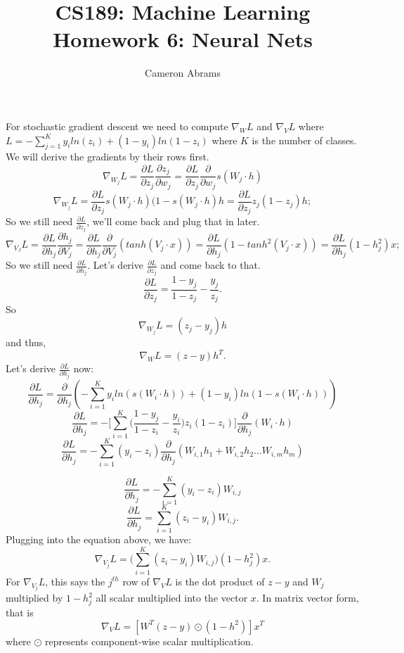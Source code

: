\documentclass[12pt]{article}
\newenvironment{problem}[2][Problem]{\begin{trivlist}
\item[\hskip \labelsep {\bfseries #1}\hskip \labelsep {\bfseries #2.}]}{\end{trivlist}}
\begin{document}
 
 
\title{CS189: Machine Learning\\
\large Homework 6: Neural Nets}
\author{Cameron Abrams}
\maketitle
 
\begin{problem}{1: Derivations}
For stochastic gradient descent we need to compute $\nabla_{W}L$ and $\nabla_{V}L$ where $L= -\sum_{j=1}^{K}y_{i}ln(z_{i}) +(1-y_{i})ln(1-z_{i})$ where $K$ is the number of classes. We will derive the gradients by their rows first.
$$\nabla_{W_{j}}L = \frac{\partial L}{\partial z_{j}}\frac{\partial z_{j}}{\partial w_{j}}=\frac{\partial L}{\partial z_{j}}\frac{\partial}{\partial w_{j}}s(W_{j}\cdot h)$$
$$\nabla_{W_{j}}L= \frac{\partial L}{\partial z_{j}}s(W_{j}\cdot h)(1-s(W_{j}\cdot h)h=\frac{\partial L}{\partial z_{j}}z_{j}(1-z_{j})h;$$
So we still need $\frac{\partial L}{\partial z_{j}}$, we'll come back and plug that in later.
$$\nabla_{V_{J}}L = \frac{\partial L}{\partial h_{j}}\frac{\partial h_{j}}{\partial V_{j}}=\frac{\partial L}{\partial h_{j}}\frac{\partial}{\partial V_{j}}(tanh(V_{j}\cdot x))
=\frac{\partial L}{\partial h_{j}}(1 - tanh^{2}(V_{j}\cdot x))
=\frac{\partial L}{\partial h_{j}}(1 - h_{j}^{2})x;$$
So we still need $\frac{\partial L}{\partial h_{j}}$. Let's derive $\frac{\partial L}{\partial z_{j}}$ and come back to that.
$$\frac{\partial L}{\partial z_{j}} = \frac{1-y_{j}}{1-z_{j}} - \frac{y_{j}}{z_{j}}.$$
So$$\nabla_{W_{j}}L = (z_{j}-y_{j})h$$
and thus, 
$$\nabla_{W}L = (z-y)h^{T}.$$
Let's derive $\frac{\partial L}{\partial h_{j}}$ now:
$$\frac{\partial L}{\partial h_{j}}=\frac{\partial}{\partial h_{j}}(-\sum_{i=1}^{K}y_{i}ln(s(W_{i}\cdot h)) +(1-y_{i})ln(1-s(W_{i}\cdot h)))$$
$$\frac{\partial L}{\partial h_{j}}=-\Big[\sum_{i=1}^{K}\Big(\frac{1-y_{j}}{1-z_{i}} - \frac{y_{i}}{z_{i}}\Big)z_{i}(1-z_{i})\Big]\frac{\partial}{\partial h_{j}}(W_i\cdot h)$$
$$\frac{\partial L}{\partial h_{j}}=-\sum_{i=1}^{K}(y_{i} - z_{i})\frac{\partial}{\partial h_{j}}(W_{i,1}h_1 + W_{i,2}h_2 \dots W_{i,m}h_{m})$$

$$\frac{\partial L}{\partial h_{j}}=-\sum_{i=1}^{K}(y_{i}-z_{i})W_{i,j}$$
$$\frac{\partial L}{\partial h_{j}}=\sum_{i=1}^{K}(z_{i}-y_{i})W_{i,j}.$$
Plugging into the equation above, we have:
$$\nabla_{V_{j}}L = \Big(\sum_{i=1}^{K}(z_{i}-y_{i})W_{i,j}\Big)(1-h_{j}^{2})x.$$
For $\nabla_{V_{j}}L$, this says the $j^{th}$ row of $\nabla_{V}L$ is the dot product of $z-y$ and $W_{j}$ multiplied by $1-h_{j}^{2}$ all scalar multiplied into the vector $x$. In matrix vector form, that is $$\nabla_{V}L = [W^{T}(z-y)\odot(1-h^{2})]x^{T}$$ where $\odot$ represents component-wise scalar multiplication.
\end{problem}
\end{document}
